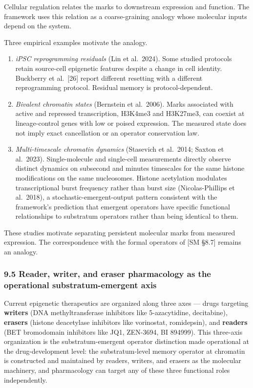 \documentclass[
]{article}
\begin{document}
Cellular regulation relates the marks to downstream expression and
function. The framework uses this relation as a coarse-graining analogy
whose molecular inputs depend on the system.

Three empirical examples motivate the analogy.

\begin{enumerate}
\def\labelenumi{(\roman{enumi})}
\item
  \emph{iPSC reprogramming residuals} (Lin et al.~2024). Some studied
  protocols retain source-cell epigenetic features despite a change in
  cell identity. Buckberry et al.~{[}26{]} report different resetting
  with a different reprogramming protocol. Residual memory is
  protocol-dependent.
\item
  \emph{Bivalent chromatin states} (Bernstein et al.~2006). Marks
  associated with active and repressed transcription, H3K4me3 and
  H3K27me3, can coexist at lineage-control genes with low or poised
  expression. The measured state does not imply exact cancellation or an
  operator conservation law.
\item
  \emph{Multi-timescale chromatin dynamics} (Stasevich et al.~2014;
  Saxton et al.~2023). Single-molecule and single-cell measurements
  directly observe distinct dynamics on subsecond and minutes timescales
  for the same histone modifications on the same nucleosomes. Histone
  acetylation modulates transcriptional burst frequency rather than
  burst size (Nicolas-Phillips et al.~2018), a
  stochastic-emergent-output pattern consistent with the framework's
  prediction that emergent operators have specific functional
  relationships to substratum operators rather than being identical to
  them.
\end{enumerate}

These studies motivate separating persistent molecular marks from
measured expression. The correspondence with the formal operators of
{[}SM §8.7{]} remains an analogy.

\hypertarget{reader-writer-and-eraser-pharmacology-as-the-operational-substratum-emergent-axis}{%
\subsubsection{9.5 Reader, writer, and eraser pharmacology as the
operational substratum-emergent
axis}\label{reader-writer-and-eraser-pharmacology-as-the-operational-substratum-emergent-axis}}

Current epigenetic therapeutics are organized along three axes --- drugs
targeting \textbf{writers} (DNA methyltransferase inhibitors like
5-azacytidine, decitabine), \textbf{erasers} (histone deacetylase
inhibitors like vorinostat, romidepsin), and \textbf{readers} (BET
bromodomain inhibitors like JQ1, ZEN-3694, BI 894999). This three-axis
organization is the substratum-emergent operator distinction made
operational at the drug-development level: the substratum-level memory
operator at chromatin is constructed and maintained by readers, writers,
and erasers as the molecular machinery, and pharmacology can target any
of these three functional roles independently.
\end{document}
